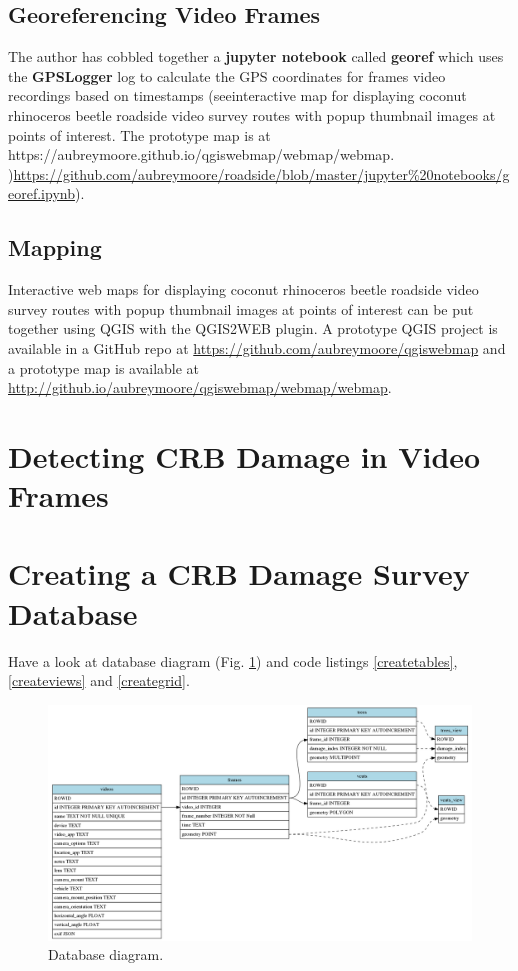 \documentclass[12pt,letterpaper,english,bibliography=totocnumbered, abstract=on]{scrartcl}
\begin{document}
\subsection{Georeferencing Video Frames}

The author has cobbled together a \textbf{jupyter notebook} called \textbf{georef} which uses the \textbf{GPSLogger} log to calculate the GPS coordinates for frames video recordings based on timestamps (seeinteractive map for displaying coconut rhinoceros beetle roadside video survey routes with popup thumbnail images at points of interest. The prototype map is at https://aubreymoore.github.io/qgiswebmap/webmap/webmap. )\url{https://github.com/aubreymoore/roadside/blob/master/jupyter%20notebooks/georef.ipynb}). 
	
\subsection{Mapping}

Interactive web maps for displaying coconut rhinoceros beetle roadside video survey routes with popup thumbnail images at points of interest can be put together using QGIS with the QGIS2WEB plugin. A prototype QGIS project is available in a GitHub repo at \url{https://github.com/aubreymoore/qgiswebmap} and a prototype map is available at \url{http://github.io/aubreymoore/qgiswebmap/webmap/webmap}.

\section{Detecting CRB Damage in Video Frames}

\section{Creating a CRB Damage Survey Database}

Have a look at database diagram (Fig. \ref{fig:erd}) and code listings \ref{createtables},  \ref{createviews} and \ref{creategrid}.

\begin{figure}[h]
	\centering
	\includegraphics[width=\linewidth]{images/erd.png}
	\caption{Database diagram.}
	\label{fig:erd}
\end{figure}
\end{document}
